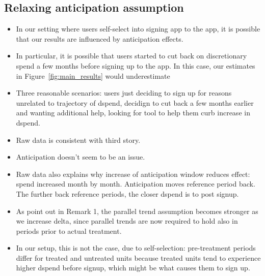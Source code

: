 
\subsection{Relaxing anticipation assumption}%
\label{sub:relaxing_anticipation_assumption}

\begin{itemize}
    \item In our setting where users self-select into signing app to the app,
        it is possible that our results are influenced by anticipation effects.

    \item In particular, it is possible that users started to cut back on
        discretionary spend a few months before signing up to the app. In this
    case, our estimates in Figure~\ref{fig:main_results} would underestimate

    \item Three reasonable scenarios: users just deciding to sign up for
        reasons unrelated to trajectory of dspend, decidign to cut back a few
        months earlier and wanting additional help, looking for tool to help
        them curb increase in dspend.

    \item Raw data is consistent with third story.

    \item Anticipation doesn't seem to be an issue.

    \item Raw data also explains why increase of anticipation window reduces
        effect: spend increased month by month. Anticipation moves reference
        period back. The further back reference periods, the closer dspend is
        to post signup.


    \item As \citet{callaway2021difference} point out in Remark 1, the parallel
        trend assumption becomes stronger as we increase delta, since parallel
        trends are now required to hold also in periods prior to actual
        treatment.

    \item In our setup, this is not the case, due to self-selection:
        pre-treatment periods differ for treated and untreated units because
        treated units tend to experience higher dspend before signup, which
        might be what causes them to sign up.

\end{itemize}

